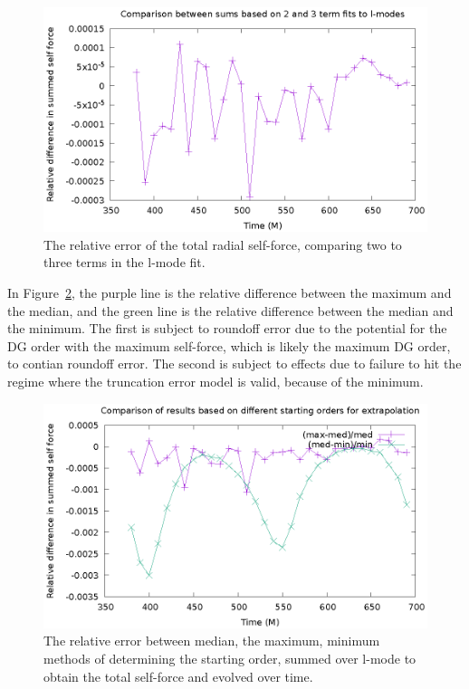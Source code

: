 \begin{figure}
  \includegraphics{relativeError23termSelfForce.eps}
  \caption{The relative error of the total radial self-force, comparing two to three terms in the l-mode fit.}
  \label{relErr23terms}
\end{figure}

In Figure~\ref{minmaxmedRelErr}, the purple line is the relative difference between the maximum and the median, and the green line is the relative difference between the median and the minimum. The first is subject to roundoff error due to the potential for the DG order with the maximum self-force, which is likely the maximum DG order, to contian roundoff error. The second is subject to effects due to failure to hit the regime where the truncation error model is valid, because of the minimum. 

\begin{figure}
  \includegraphics{minmaxmedrelativeerror3termavgl.eps}
  \caption{The relative error between median, the maximum, minimum methods of determining the starting order, summed over l-mode to obtain the total self-force and evolved over time.}
    \label{minmaxmedRelErr}
\end{figure}
  




